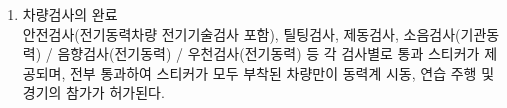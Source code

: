 \documentclass[final,a4paper,10pt]{report}
\begin{document}
\begin{enumerate}
    \begin{enumerate}
      \item\label{rule:formula-competition.vehicle-inspection.correct-and-reinspect.reinspect-anytime} 조직위원회는 대회기간 중 언제든지 임의의 차량을 재조사할 수 있고, 부적합한 사항에 대하여 수정을 요구할 수 있다.
      \item\label{rule:formula-competition.vehicle-inspection.correct-and-reinspect.overtime-fail-disqualifies} 검차 운영시간을 초과하여 검차를 통과하지 못한 차량은 실격 처리되고 모든 경기 참가가 제한된다.
    \end{enumerate}
  \item\label{rule:formula-competition.vehicle-inspection.completion-stickers} 차량검사의 완료\\
    안전검사(전기동력차량 전기기술검사 포함), 틸팅검사, 제동검사, 소음검사(기관동력) / 음향검사(전기동력) / 우천검사(전기동력) 등 각 검사별로 통과 스티커가 제공되며, 전부 통과하여 스티커가 모두 부착된 차량만이 동력계 시동, 연습 주행 및 경기의 참가가 허가된다.
\end{enumerate}
\end{document}
